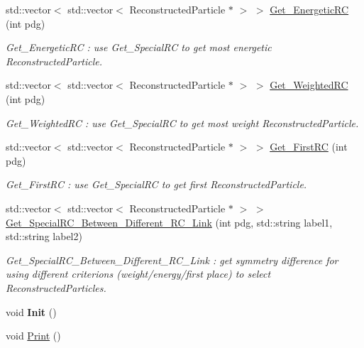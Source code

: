\begin{DoxyCompactItemize}
std::vector$<$ std::vector$<$ ReconstructedParticle $\ast$ $>$ $>$ \hyperlink{classToolSet_1_1CChain__Vec_a820a5e8d1bde159334145996758d085e}{Get\_\-EnergeticRC} (int pdg)
\begin{DoxyCompactList}\small\item\em Get\_\-EnergeticRC : use Get\_\-SpecialRC to get most energetic ReconstructedParticle. \item\end{DoxyCompactList}\item 
std::vector$<$ std::vector$<$ ReconstructedParticle $\ast$ $>$ $>$ \hyperlink{classToolSet_1_1CChain__Vec_a603890a7bfff43b56cb6eba14e81fee2}{Get\_\-WeightedRC} (int pdg)
\begin{DoxyCompactList}\small\item\em Get\_\-WeightedRC : use Get\_\-SpecialRC to get most weight ReconstructedParticle. \item\end{DoxyCompactList}\item 
std::vector$<$ std::vector$<$ ReconstructedParticle $\ast$ $>$ $>$ \hyperlink{classToolSet_1_1CChain__Vec_a905c1fd107c1b322d6ef151f663e572b}{Get\_\-FirstRC} (int pdg)
\begin{DoxyCompactList}\small\item\em Get\_\-FirstRC : use Get\_\-SpecialRC to get first ReconstructedParticle. \item\end{DoxyCompactList}\item 
std::vector$<$ std::vector$<$ ReconstructedParticle $\ast$ $>$ $>$ \hyperlink{classToolSet_1_1CChain__Vec_abf7fb35af91c6059d381d5a278a96574}{Get\_\-SpecialRC\_\-Between\_\-Different\_\-RC\_\-Link} (int pdg, std::string label1, std::string label2)
\begin{DoxyCompactList}\small\item\em Get\_\-SpecialRC\_\-Between\_\-Different\_\-RC\_\-Link : get symmetry difference for using different criterions (weight/energy/first place) to select ReconstructedParticles. \item\end{DoxyCompactList}\item 
\hypertarget{classToolSet_1_1CChain__Vec_a814d3a551ec3986ba85ba598a38ced91}{
void {\bfseries Init} ()}
\label{classToolSet_1_1CChain__Vec_a814d3a551ec3986ba85ba598a38ced91}

\item 
\hypertarget{classToolSet_1_1CChain__Vec_a67738820b5fe16dcd3b6ba834a7f3088}{
void \hyperlink{classToolSet_1_1CChain__Vec_a67738820b5fe16dcd3b6ba834a7f3088}{Print} ()}
\label{classToolSet_1_1CChain__Vec_a67738820b5fe16dcd3b6ba834a7f3088}


\end{DoxyCompactItemize}
